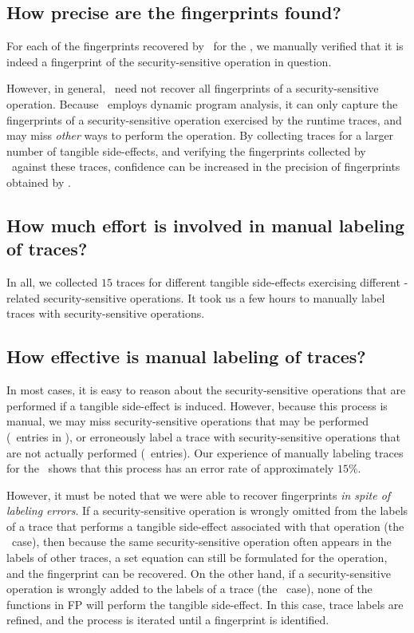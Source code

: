 \subsection{How precise are the fingerprints found?}
%
For each of the fingerprints recovered by \aid\ for the \xserver, we 
manually verified that it is indeed a fingerprint of the security-sensitive
operation in question. 

However, in general, \aid\ need not recover all fingerprints of a
security-sensitive operation. Because \aid\ employs dynamic program analysis,
it can only capture the fingerprints of a security-sensitive operation
exercised by the runtime traces, and may miss \textit{other} ways to perform
the operation. By collecting traces for a larger number of tangible
side-effects, and verifying the fingerprints collected by \aid\ against these
traces, confidence can be increased in the precision of fingerprints obtained
by \aid. 

\subsection{How much effort is involved in manual labeling of traces?}
%
In all, we collected $15$ traces for different tangible side-effects exercising
different -related security-sensitive operations. It took us a few
hours to manually label traces with security-sensitive operations.

\subsection{How effective is manual labeling of traces?}
%
In most cases, it is easy to reason about the security-sensitive operations
that are performed if a tangible side-effect is induced. However, because this
process is manual, we may miss security-sensitive operations that may be
performed (\my\ entries in ), or erroneously
label a trace with security-sensitive operations that are not actually
performed (\mn\ entries). Our experience of manually labeling traces for the
\xserver\ shows that this process has an error rate of approximately $15\%$.

However, it must be noted that we were able to recover fingerprints 
\textit{in spite of labeling errors}. If a security-sensitive operation is
wrongly omitted from the labels of a trace that performs a tangible side-effect
associated with that operation (the \my\ case), then because the same
security-sensitive operation often appears in the labels of other traces, a
set equation can still be formulated for the operation, and the fingerprint can
be recovered. On the other hand, if a security-sensitive operation is wrongly
added to the labels of a trace (the \mn\ case), none of the functions in FP
will perform the tangible side-effect. In this case, trace labels are refined,
and the process is iterated until a fingerprint is identified.

